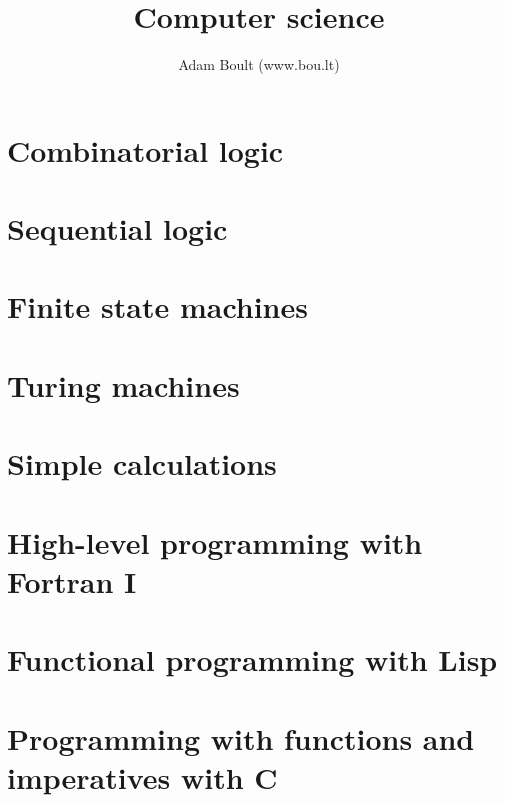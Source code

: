\documentclass[oneside]{book}
\begin{document}
\author{Adam Boult (www.bou.lt)}
\title{Computer science}
\maketitle

\setcounter{tocdepth}{0}
\tableofcontents



\part{Combinatorial logic}




\part{Sequential logic}



\part{Finite state machines}



\part{Turing machines}







\part{Simple calculations}



\part{High-level programming with Fortran I}




\part{Functional programming with Lisp}





\part{Programming with functions and imperatives with C}















\end{document}
